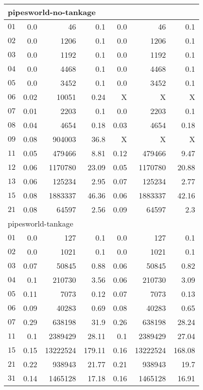 \begin{longtable}{|c||r|r|r||r|r|r|}
\multicolumn{7}{|l|}{pipesworld-no-tankage}\\\hline
$01$ & 0.0 & 46 & 0.1 &0.0 & 46 & 0.1 \\\hline
$02$ & 0.0 & 1206 & 0.1 &0.0 & 1206 & 0.1 \\\hline
$03$ & 0.0 & 1192 & 0.1 &0.0 & 1192 & 0.1 \\\hline
$04$ & 0.0 & 4468 & 0.1 &0.0 & 4468 & 0.1 \\\hline
$05$ & 0.0 & 3452 & 0.1 &0.0 & 3452 & 0.1 \\\hline
$06$ & 0.02 & 10051 & 0.24 &X & X & X \\\hline
$07$ & 0.01 & 2203 & 0.1 &0.0 & 2203 & 0.1 \\\hline
$08$ & 0.04 & 4654 & 0.18 &0.03 & 4654 & 0.18 \\\hline
$09$ & 0.08 & 904003 & 36.8 &X & X & X \\\hline
$11$ & 0.05 & 479466 & 8.81 &0.12 & 479466 & 9.47 \\\hline
$12$ & 0.06 & 1170780 & 23.09 &0.05 & 1170780 & 20.88 \\\hline
$13$ & 0.06 & 125234 & 2.95 &0.07 & 125234 & 2.77 \\\hline
$15$ & 0.08 & 1883337 & 46.36 &0.06 & 1883337 & 42.16 \\\hline
$21$ & 0.08 & 64597 & 2.56 &0.09 & 64597 & 2.3 \\\hline


\multicolumn{7}{|l|}{pipesworld-tankage}\\\hline
$01$ & 0.0 & 127 & 0.1 &0.0 & 127 & 0.1 \\\hline
$02$ & 0.0 & 1021 & 0.1 &0.0 & 1021 & 0.1 \\\hline
$03$ & 0.07 & 50845 & 0.88 &0.06 & 50845 & 0.82 \\\hline
$04$ & 0.1 & 210730 & 3.56 &0.06 & 210730 & 3.09 \\\hline
$05$ & 0.11 & 7073 & 0.12 &0.07 & 7073 & 0.13 \\\hline
$06$ & 0.09 & 40283 & 0.69 &0.08 & 40283 & 0.65 \\\hline
$07$ & 0.29 & 638198 & 31.9 &0.26 & 638198 & 28.24 \\\hline
$11$ & 0.1 & 2389429 & 28.11 &0.1 & 2389429 & 27.04 \\\hline
$15$ & 0.15 & 13222524 & 179.11 &0.16 & 13222524 & 168.08 \\\hline
$21$ & 0.22 & 938943 & 21.77 &0.21 & 938943 & 19.7 \\\hline
$31$ & 0.14 & 1465128 & 17.18 &0.16 & 1465128 & 16.91 \\\hline


\end{longtable}
